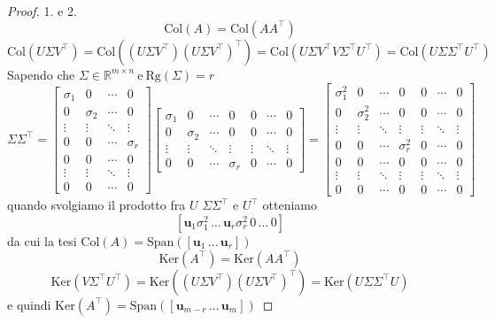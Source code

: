 \documentclass[11pt]{article}
\newcommand{\R}{\mathbb{R}} %
\begin{document}
\begin{proof}{1. e 2.}
\[
\text{Col}(A)=\text{Col}(AA^\top      )
\]
\[
\text{Col}(U\Sigma V^\top      )=\text{Col}((U\Sigma V^\top      )(U\Sigma V^\top      )^\top      )=\text{Col}(U\Sigma V^\top      V\Sigma^\top U^\top)=\text{Col}(U\Sigma \Sigma^\top U^\top)
\]
Sapendo che $ \Sigma \in \R^{m \times n} \ \text{e} \ \text{Rg}(\Sigma)=r$
\[
\Sigma \Sigma^\top       = \begin{bmatrix}
\sigma_1 & 0 & \cdots & 0 \\
0 & \sigma_2 & \cdots & 0 \\
\vdots & \vdots & \ddots & \vdots \\
0 & 0 & \cdots & \sigma_r \\
0 & 0 & \cdots & 0 \\
\vdots & \vdots & \ddots & \vdots \\
0 & 0 & \cdots & 0
\end{bmatrix}
\begin{bmatrix}
\sigma_1 & 0 & \cdots & 0 & 0 & \cdots & 0 \\
0 & \sigma_2 & \cdots & 0 & 0 & \cdots & 0 \\
\vdots & \vdots & \ddots & \vdots & \vdots & \ddots & \vdots \\
0 & 0 & \cdots & \sigma_r & 0 & \cdots & 0
\end{bmatrix}
=
\begin{bmatrix}
\sigma_1^2 & 0 & \cdots & 0 & 0 & \cdots & 0 \\
0 & \sigma_2^2 & \cdots & 0 & 0 & \cdots & 0 \\
\vdots & \vdots & \ddots & \vdots & \vdots & \ddots & \vdots \\
0 & 0 & \cdots & \sigma_r^2 & 0 & \cdots & 0 \\
0 & 0 & \cdots & 0 & 0 & \cdots & 0 \\
\vdots & \vdots & \ddots & \vdots & \vdots & \ddots & \vdots \\
0 & 0 & \cdots & 0 & 0 & \cdots & 0
\end{bmatrix}
\]
quando svolgiamo il prodotto fra $U$ $\Sigma \Sigma^\top $ e $U^\top$ otteniamo \[
[\mathbf{u}_1 \sigma_1^2 \, \dots \, \mathbf{u}_r \sigma_r^2 \, 0 \, \dots \, 0]
\]
da cui la tesi $\text{Col}(A)=\text{Span}([\mathbf{u}_1 \, \dots \, \mathbf{u}_r])$
$$\text{Ker}(A^\top      )=\text{Ker}(AA^\top      )$$ 
\[
\text{Ker}(V\Sigma^\top      U^\top      )=\text{Ker}((U\Sigma V^\top      )(U \Sigma V^\top      )^\top      )=\text{Ker}(U\Sigma \Sigma^\top       U)
\]
e quindi $\text{Ker}(A^\top      )=\text{Span}([\mathbf{u}_{m-r} \, \dots \, \mathbf{u}_m])$
\end{proof}
\end{document}
